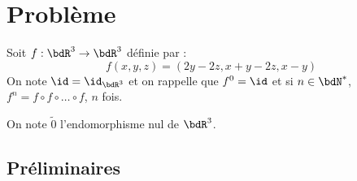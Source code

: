 \documentclass[a4paper,french,bookmarks]{article}
\begin{document}

\section*{Problème}

Soit $f : \bdR^3 \to \bdR^3$ définie par :
%
\begin{equation}
     f\left(x, y, z\right) = \left(2y - 2z, x+ y - 2z, x - y\right)
\end{equation}
%
On note $\id = \id_{\bdR^3}$ et on rappelle que $f^0 = \id$ et si 
$n \in \bdN^*$,\quad $f^n = f \circ f \circ \dots \circ f$, $n$ fois.

On note $\widetilde 0$ l'endomorphisme nul de $\bdR^3$.

\subsection*{Préliminaires}
\end{document}
